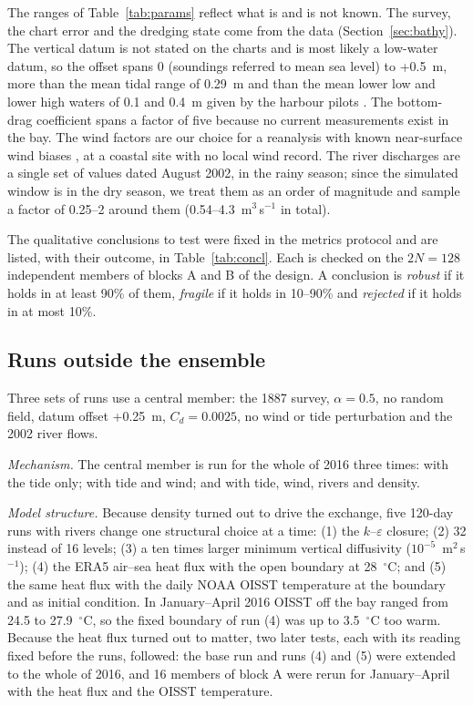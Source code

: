 \documentclass[a4paper,fleqn]{ems-dc}
\begin{document}
The ranges of Table~\ref{tab:params} reflect what is and is not known. The survey, the
chart error and the dredging state come from the data (Section~\ref{sec:bathy}). The
vertical datum is not stated on the charts and is most likely a low-water datum, so the
offset spans 0 (soundings referred to mean sea level) to +0.5~m, more than the mean tidal
range of 0.29~m \citep{JICA2004} and than the mean lower low and lower high waters of 0.1
and 0.4~m given by the harbour pilots \citep{Practicos2018}. The bottom-drag coefficient
spans a factor of five because no current measurements exist in the bay. The wind factors
are our choice for a reanalysis with known near-surface wind biases
\citep{BelmonteRivas2019}, at a coastal site with no local wind record. The river discharges
are a single set of values dated August 2002, in the rainy season; since the simulated
window is in the dry season, we treat them as an order of magnitude and sample a factor of
0.25--2 around them (0.54--4.3~m$^3$\,s$^{-1}$ in total).

The qualitative conclusions to test were fixed in the metrics protocol and are listed, with
their outcome, in Table~\ref{tab:concl}. Each is checked on the $2N = 128$ independent
members of blocks A and B of the design. A conclusion is \emph{robust} if it holds in at
least 90\% of them, \emph{fragile} if it holds in 10--90\% and \emph{rejected} if it holds
in at most 10\%.

\subsection{Runs outside the ensemble}\label{sec:extra}
Three sets of runs use a central member: the 1887 survey, $\alpha = 0.5$, no random field,
datum offset +0.25~m, $C_d = 0.0025$, no wind or tide perturbation and the 2002 river flows.

\emph{Mechanism.} The central member is run for the whole of 2016 three times: with the tide
only; with tide and wind; and with tide, wind, rivers and density.

\emph{Model structure.} Because density turned out to drive the exchange, five 120-day runs
with rivers change one structural choice at a time: (1) the $k$--$\varepsilon$ closure;
(2) 32 instead of 16 levels; (3) a ten times larger minimum vertical diffusivity
($10^{-5}$~m$^2$\,s$^{-1}$); (4) the ERA5 air--sea heat flux with the open boundary at
28~$^\circ$C; and (5) the same heat flux with the daily NOAA OISST temperature
\citep{Huang2021} at the boundary and as initial condition. In January--April 2016 OISST off
the bay ranged from 24.5 to 27.9~$^\circ$C, so the fixed boundary of run (4) was up to
3.5~$^\circ$C too warm. Because the heat flux turned out to matter, two later tests, each
with its reading fixed before the runs, followed: the base run and runs (4) and (5) were
extended to the whole of 2016, and 16 members of block A were rerun for January--April with
the heat flux and the OISST temperature.
\end{document}
